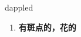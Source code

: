 
\begin{frame}
{\huge dappled}
\begin{center}
\begin{enumerate}\Large
  \item \textbf{有斑点的，花的}
\end{enumerate}
\end{center}
\end{frame}
